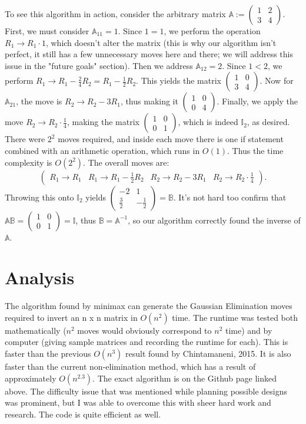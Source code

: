 \documentclass{article}
\begin{document}
To see this algorithm in action, consider the arbitrary matrix $\mathbb{A}:=\begin{pmatrix}1 & 2 \\ 3 & 4\end{pmatrix}$. First, we must consider $\mathbb{A}_{11}=1$. Since $1=1$, we perform the operation $R_1\to R_1\cdot 1$, which doesn't alter the matrix (this is why our algorithm isn't perfect, it still has a few unnecessary moves here and there; we will address this issue in the "future goals" section). Then we address $\mathbb{A}_{12}=2$. Since $1<2$, we perform $R_1\to R_1-\frac{2}{4}R_2=R_1-\frac{1}{2}R_2$. This yields the matrix $\begin{pmatrix}1 & 0 \\ 3 & 4\end{pmatrix}$. Now for $\mathbb{A}_{21}$, the move is $R_2\to R_2-3R_1$, thus making it $\begin{pmatrix}1 & 0 \\ 0 & 4\end{pmatrix}$. Finally, we apply the move $R_2\to R_2\cdot \frac{1}{4}$, making the matrix $\begin{pmatrix} 1 & 0 \\ 0 & 1\end{pmatrix}$, which is indeed $\mathbb{I}_2$, as desired. There were $2^2$ moves required, and inside each move there is one if statement combined with an arithmetic operation, which runs in $O(1)$. Thus the time complexity is $O(2^2)$. The overall moves are:
$$\begin{pmatrix}R_1\to R_1 & R_1\to R_1-\frac{1}{2}R_2 & R_2\to R_2-3R_1 & R_2\to R_2\cdot \frac{1}{4}\end{pmatrix}.$$
Throwing this onto $\mathbb{I}_2$ yields $\begin{pmatrix}-2 & 1\\ \frac{3}{2} & -\frac{1}{2}\end{pmatrix}=\mathbb{B}$. It's not hard too confirm that $\mathbb{A}\mathbb{B}=\begin{pmatrix}1 & 0 \\ 0 & 1\end{pmatrix}=\mathbb{I}$, thus $\mathbb{B}=\mathbb{A}^{-1}$, so our algorithm correctly found the inverse of $\mathbb{A}$.
\section*{Analysis}
The algorithm found by minimax can generate the Gaussian Elimination moves required to invert an n x n matrix in $O(n^2)$ time. The runtime was tested both mathematically ($n^2$ moves would obviously correspond to $n^2$ time) and by computer (giving sample matrices and recording the runtime for each). This is faster than the previous $O(n^3)$ result found by Chintamaneni, 2015. It is also faster than the current non-elimination method, which has a result of approximately $O(n^{2.3})$. The exact algorithm is on the Github page linked above. The difficulty issue that was mentioned while planning possible designs was prominent, but I was able to overcome this with sheer hard work and research. The code is quite efficient as well.
\end{document}
